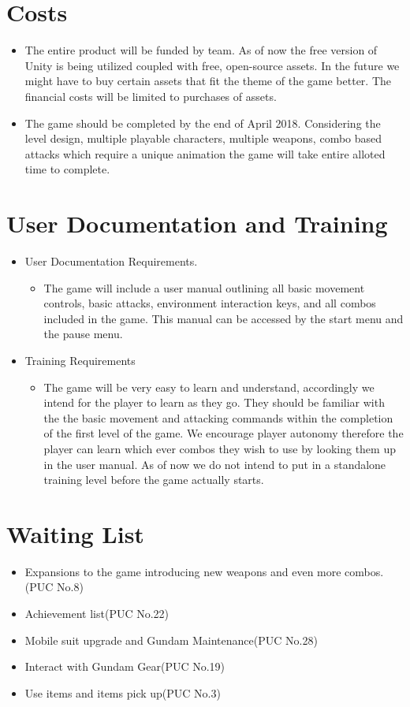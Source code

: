 \documentclass{article}
\begin{document}
	\section{Costs}
	\begin{itemize}
		\item The entire product will be funded by team. As of now the free version of Unity is being utilized coupled with free, open-source assets. In the future we might have to buy certain assets that fit the theme of the game better. The financial costs will be limited to purchases of assets.
		\item The game should be completed by the end of April 2018. Considering the level design, multiple playable characters, multiple weapons, combo based attacks which require a unique animation the game will take entire alloted time to complete.
	\end{itemize}

	\section{User Documentation and Training}
	\begin{itemize}
		\item User Documentation Requirements.
		\begin{itemize}
			\item The game will include a user manual outlining all basic movement controls, basic attacks, environment interaction keys, and all combos included in the game. This manual can be accessed by the start menu and the pause menu.
		\end{itemize}
		\item Training Requirements
		\begin{itemize}
			\item The game will be very easy to learn and understand, accordingly we intend for the player to learn as they go. They should be familiar with the the basic movement and attacking commands within the completion of the first level of the game. We encourage player autonomy therefore the player can learn which ever combos they wish to use by looking them up in the user manual. As of now we do not intend to put in a standalone training level before the game actually starts.
		\end{itemize}
	\end{itemize}

	\section{Waiting List}
	\begin{itemize}
		\item Expansions to the game introducing new weapons and even more combos.(PUC No.8)
		\item Achievement list(PUC No.22)
		\item Mobile suit upgrade and Gundam Maintenance(PUC No.28)
		\item Interact with Gundam Gear(PUC No.19)
		\item Use items and items pick up(PUC No.3)
	\end{itemize}
\end{document}
